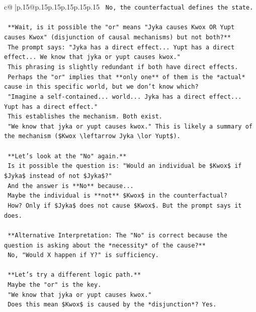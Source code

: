 \documentclass{article}
\begin{document}
{\begin{supertabular}{c@{$\;$}|p{.15\linewidth}@{}p{.15\linewidth}p{.15\linewidth}p{.15\linewidth}p{.15\linewidth}p{.15\linewidth}}
{{{\texttt{    No, the counterfactual defines the state.} \\
\\ 
\texttt{    **Wait, is it possible the "or" means "Jyka causes Kwox OR Yupt causes Kwox" (disjunction of causal mechanisms) but not both?**} \\
\texttt{    The prompt says: "Jyka has a direct effect... Yupt has a direct effect... We know that jyka or yupt causes kwox."} \\
\texttt{    This phrasing is slightly redundant if both have direct effects.} \\
\texttt{    Perhaps the "or" implies that **only one** of them is the *actual* cause in this specific world, but we don't know which?} \\
\texttt{    "Imagine a self{-}contained... world... Jyka has a direct effect... Yupt has a direct effect."} \\
\texttt{    This establishes the mechanism. Both exist.} \\
\texttt{    "We know that jyka or yupt causes kwox." This is likely a summary of the mechanism (\$Kwox \textbackslash{}leftarrow Jyka \textbackslash{}lor Yupt\$).} \\
\\ 
\texttt{    **Let's look at the "No" again.**} \\
\texttt{    Is it possible the question is: "Would an individual be \$Kwox\$ if \$Jyka\$ instead of not \$Jyka\$?"} \\
\texttt{    And the answer is **No** because...} \\
\texttt{    Maybe the individual is **not** \$Kwox\$ in the counterfactual?} \\
\texttt{    How? Only if \$Jyka\$ does not cause \$Kwox\$. But the prompt says it does.} \\
\\ 
\texttt{    **Alternative Interpretation: The "No" is correct because the question is asking about the *necessity* of the cause?**} \\
\texttt{    No, "Would X happen if Y?" is sufficiency.} \\
\\ 
\texttt{    **Let's try a different logic path.**} \\
\texttt{    Maybe the "or" is the key.} \\
\texttt{    "We know that jyka or yupt causes kwox."} \\
\texttt{    Does this mean \$Kwox\$ is caused by the *disjunction*? Yes.} \\
}}}
\end{supertabular}}
\end{document}
